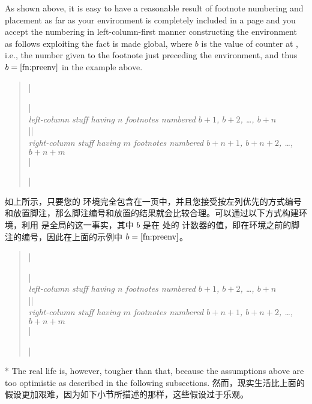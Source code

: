 \begin{paracol}{2}
As shown above, it is easy to have a reasonable result of footnote
numbering and placement as far as your  environment is
completely included in a page and you accept the numbering in
left-column-first manner constructing the environment as follows
exploiting the fact  is made global, where $b$ is the
value of  counter at \beginparacol, i.e., the number
given to the footnote just preceding the environment, and thus
$b=\ref{fn:preenv}$ in the example above.
\begin{quote}\vskip-1pt
|\begin{paracol}{2}|\\
\textit{left-column stuff having $n$ footnotes numbered $b+1$, $b+2$,
\ldots, $b+n$}\\
|\switchcolumn|\\
\textit{right-column stuff having $m$ footnotes numbered $b+n+1$, $b+n+2$,
\ldots, $b+n+m$}\\
|\end{paracol}|
\end{quote}\vskip-1pt
\switchcolumn
如上所示，只要您的  环境完全包含在一页中，并且您接受按左列优先的方式编号和放置脚注，那么脚注编号和放置的结果就会比较合理。可以通过以下方式构建环境，利用  是全局的这一事实，其中 $b$ 是在 \beginparacol 处的  计数器的值，即在环境之前的脚注的编号，因此在上面的示例中 $b=\ref{fn:preenv}$。
\begin{quote}\vskip-1pt
|\begin{paracol}{2}|\\
\textit{left-column stuff having $n$ footnotes numbered $b+1$, $b+2$,
\ldots, $b+n$}\\
|\switchcolumn|\\
\textit{right-column stuff having $m$ footnotes numbered $b+n+1$, $b+n+2$,
\ldots, $b+n+m$}\\
|\end{paracol}|
\end{quote}\vskip-1pt
\switchcolumn[0]*
The real life is, however, tougher than that, because the assumptions above
are too optimistic as described in the following subsections.
\switchcolumn
然而，现实生活比上面的假设更加艰难，因为如下小节所描述的那样，这些假设过于乐观。
\end{paracol}
\vskip-3pt\vskip0pt